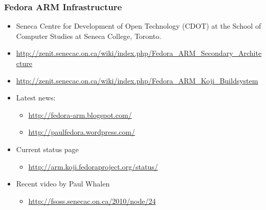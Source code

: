 \documentclass[11pt]{beamer}
\begin{document}
\begin{frame}[fragile]\frametitle{Fedora ARM Infrastructure}
\label{sec-5.1}

\begin{itemize}

\item Seneca Centre for Development of Open Technology (CDOT) at the School of Computer Studies at Seneca College, Toronto.\\
\label{sec-5.1.1}


\item \href{http://zenit.senecac.on.ca/wiki/index.php/Fedora_ARM_Secondary_Architecture}{http://zenit.senecac.on.ca/wiki/index.php/Fedora\_ARM\_Secondary\_Architecture}\\
\label{sec-5.1.2}


\item \href{http://zenit.senecac.on.ca/wiki/index.php/Fedora_ARM_Koji_Buildsystem}{http://zenit.senecac.on.ca/wiki/index.php/Fedora\_ARM\_Koji\_Buildsystem}\\
\label{sec-5.1.3}


\item Latest news:\\
\label{sec-5.1.4}

\begin{itemize}

\item \href{http://fedora-arm.blogspot.com/}{http://fedora-arm.blogspot.com/}\\
\label{sec-5.1.4.1}


\item \href{http://paulfedora.wordpress.com/}{http://paulfedora.wordpress.com/}\\
\label{sec-5.1.4.2}

\end{itemize} %

\item Current status page\\
\label{sec-5.1.5}

\begin{itemize}

\item \href{http://arm.koji.fedoraproject.org/status/}{http://arm.koji.fedoraproject.org/status/}\\
\label{sec-5.1.5.1}

\end{itemize} %

\item Recent video by Paul Whalen\\
\label{sec-5.1.6}

\begin{itemize}

\item \href{http://fsoss.senecac.on.ca/2010/node/24}{http://fsoss.senecac.on.ca/2010/node/24}\\
\label{sec-5.1.6.1}


\end{itemize} %
\end{itemize} %
\end{frame}
\end{document}
